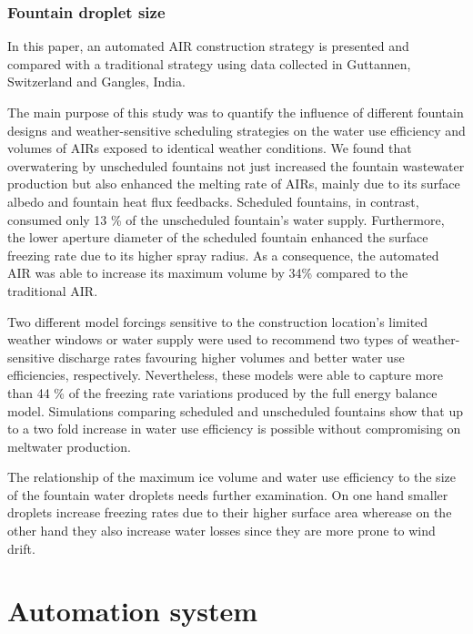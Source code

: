 \documentclass[tc, manuscript]{copernicus}
\begin{document}
\subsubsection{Fountain droplet size}

\conclusions

In this paper, an automated AIR construction strategy is presented and compared with a traditional strategy
using data collected in Guttannen, Switzerland and Gangles, India.

The main purpose of this study was to quantify the influence of different fountain designs and weather-sensitive
scheduling strategies on the water use efficiency and volumes of AIRs exposed to identical weather conditions.
We found that overwatering by unscheduled fountains not just increased the fountain wastewater production but
also enhanced the melting rate of AIRs, mainly due to its surface albedo and fountain heat flux feedbacks.
Scheduled fountains, in contrast, consumed only 13 \% of the unscheduled fountain's water supply.  Furthermore,
the lower aperture diameter of the scheduled fountain enhanced the surface freezing rate due to its higher spray
radius. As a consequence, the automated AIR was able to increase its maximum volume by 34\% compared to the
traditional AIR.

Two different model forcings sensitive to the construction location's limited weather windows or water supply
were used to recommend two types of weather-sensitive discharge rates favouring higher volumes and better water
use efficiencies, respectively. Nevertheless, these models were able to capture more than 44 \% of the freezing
rate variations produced by the full energy balance model. Simulations comparing scheduled and unscheduled
fountains show that up to a two fold increase in water use efficiency is possible without compromising on
meltwater production.

The relationship of the maximum ice volume and water use efficiency to the size of the fountain water droplets
needs further examination. On one hand smaller droplets increase freezing rates due to their higher surface area
wherease on the other hand they also increase water losses since they are more prone to wind drift.

\appendix


\section{Automation system} \label{sec:auto_system}
\end{document}
